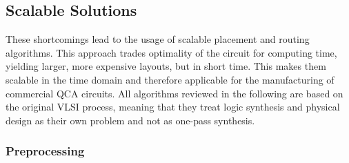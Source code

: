 \subsection{Scalable Solutions}
These shortcomings lead to the usage of scalable placement and routing algorithms. This approach trades optimality of the circuit for computing time, yielding larger, more expensive layouts, but in short time. This makes them scalable in the time domain and therefore applicable for the manufacturing of commercial QCA circuits. All algorithms reviewed in the following are based on the original VLSI process, meaning that they treat logic synthesis and physical design as their own problem and not as one-pass synthesis.

\subsubsection{Preprocessing}
